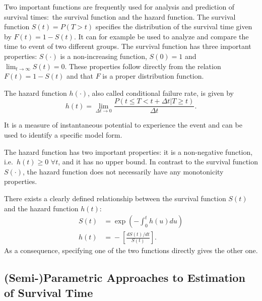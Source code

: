 \documentclass[12pt, a4paper]{scrartcl}
\theoremstyle{definition}
\theoremstyle{plain}
\numberwithin{equation}{section}
\numberwithin{figure}{section}
\numberwithin{table}{section}
\begin{document}
	
	Two important functions are frequently used for analysis and prediction of survival times:~the survival function and the hazard function.
	The survival function $S(t) = P(T > t)$ specifies the distribution of the survival time given by $F(t) = 1 - S(t)$.
	It can for example be used to analyze and compare the time to event of two different groups.
	The survival function has three important properties: $S(\cdot)$ is a non-increasing function, $S(0)=1$ and $\lim_{t \to \infty} S(t)=0$.
	These properties follow directly from the relation $F(t)=1-S(t)$ and that $F$ is a proper distribution function.
	
	The hazard function $h(\cdot)$, also called conditional failure rate, is given by
	\begin{equation*}
		h(t) = \lim_{\Delta t \to 0}\frac{P(t \leq T < t + \Delta t \vert T \geq t)}{\Delta t}.
	\end{equation*} 
	
	It is a measure of instantaneous potential to experience the event and can be used to identify a specific model form.
	
	The hazard function has two important properties: it is a non-negative function, i.e.~$h(t) \geq 0$ $ \forall t$, and it has no upper bound.
	In contrast to the survival function $S(\cdot)$, the hazard function does not necessarily have any monotonicity properties.

	There exists a clearly defined relationship between the survival function $S(t)$ and the hazard function $h(t)$:
	\begin{equation*}
	\begin{split}
		S(t) &={} \exp \left( - \int_{0}^{t}h(u)du\right) \\
		h(t) & ={} - \left[ \frac{dS(t)/dt}{S(t)}\right].
	\end{split}
	\end{equation*}
	As a consequence, specifying one of the two functions directly gives the other one.
	
	
	
	\subsection{(Semi-)Parametric Approaches to Estimation of Survival Time} \label{cox}
\end{document}
